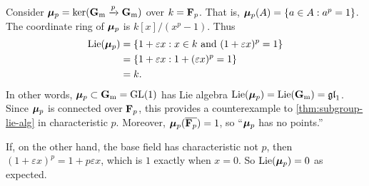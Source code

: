 \begin{example}
Consider $\bm{\mu}_p=\ker(\mathbf{G}_\mathrm{m}\xrightarrow p \mathbf{G}_\mathrm{m})$ over $k=\mathbf{F}_p$. That is, 
$\bm{\mu}_p(A)=\{a\in A:a^p=1\}$. The coordinate ring of $\bm{\mu}_p$ is 
$k[x]/(x^p-1)$. Thus 
\begin{align*}
  \operatorname{Lie}(\bm{\mu}_p)
    &= \{1+\varepsilon x:x\in k\text{ and }(1+\varepsilon x)^p=1\} \\
    &= \{1+\varepsilon x:1+(\varepsilon x)^p = 1\} \\
    &= k .
\end{align*}
In other words, $\bm{\mu}_p\subset \mathbf{G}_\mathrm{m}=\operatorname{GL}(1)$ has Lie algebra 
$\operatorname{Lie}(\bm{\mu}_p) = \operatorname{Lie}(\mathbf{G}_\mathrm{m})=\mathfrak{gl}_1$. Since $\bm{\mu}_p$ is connected over 
$\mathbf{F}_p$, this provides a counterexample to 
\autoref{thm:subgroup-lie-alg} in characteristic $p$. Moreover, 
$\bm{\mu}_p(\overline{\mathbf{F}_p})=1$, so ``$\bm{\mu}_p$ has no points.''
\end{example}

If, on the other hand, the base field has 
characteristic not $p$, then $(1+\varepsilon x)^p = 1+p\varepsilon x$, which is 
$1$ exactly when $x=0$. So $\operatorname{Lie}(\bm{\mu}_p)=0$ as expected. 





